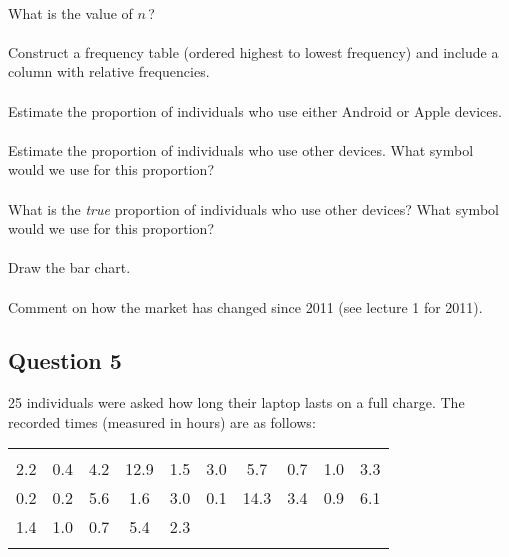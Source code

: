 \documentclass[12pt]{article}
\begin{document}
\hspace{-1.8cm}{\bf a.}\vspace{-0.5cm}\\
What is the value of $n$\,?\\[-0.3cm]

\hspace{-1.8cm}{\bf b.}\vspace{-0.5cm}\\
Construct a frequency table (ordered highest to lowest frequency) and include a column with relative frequencies.\\[-0.3cm]

\hspace{-1.8cm}{\bf c.}\vspace{-0.5cm}\\
Estimate the proportion of individuals who use either Android or Apple devices.\\[-0.3cm]

\hspace{-1.8cm}{\bf d.}\vspace{-0.5cm}\\
Estimate the proportion of individuals who use other devices. What symbol would we use for this proportion?\\[-0.3cm]

\hspace{-1.8cm}{\bf e.}\vspace{-0.5cm}\\
What is the \emph{true} proportion of individuals who use other devices? What symbol would we use for this proportion?\\[-0.3cm]

\hspace{-1.8cm}{\bf f.}\vspace{-0.5cm}\\
Draw the bar chart.\\[-0.3cm]

\hspace{-1.8cm}{\bf g.}\vspace{-0.5cm}\\
Comment on how the market has changed since 2011 (see lecture 1 for 2011).\\[-0.3cm]


\subsection*{Question 5}
25 individuals were asked how long their laptop lasts on a full charge. The recorded times (measured in hours) are as follows:
\begin{center}
\begin{tabular}{|cccccccccc|}
\hline
&&&&&&&&&\\[-0.4cm]
2.2 & 0.4 & 4.2 & 12.9 & 1.5 & 3.0 & 5.7  & 0.7 & 1.0 & 3.3 \\
0.2 & 0.2 & 5.6 &  1.6 & 3.0 & 0.1 & 14.3 & 3.4 & 0.9 & 6.1 \\
1.4 & 1.0 & 0.7 & 5.4  & 2.3 &&&&&\\
\hline
\multicolumn{10}{c}{}\\
\end{tabular}
\end{center}
\end{document}
